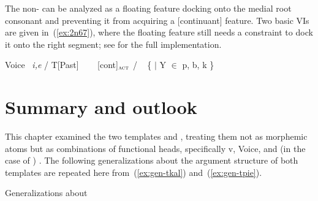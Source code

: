 \begin{exe}
\begin{xlist}
\begin{exe}
\begin{xlist}
\begin{exe}
\begin{xlist}
\begin{exe}
\begin{exe}
\begin{xlist}
\begin{exe}
\begin{xlist}
\begin{exe}
\begin{xlist}
\begin{exe}
\begin{xlist}
\begin{exe}
\begin{xlist}
\begin{exe}
\begin{xlist}
\begin{exe}
\begin{xlist}
\begin{exe}
\begin{xlist}
\begin{exe}
\begin{xlist}
\begin{exe}
\begin{xlist}
\begin{exe}
\begin{xlist}
\begin{exe}
\begin{xlist}
\begin{exe}
\begin{xlist}
\begin{exe}
\begin{exe}
\begin{xlist}
\begin{exe}
\begin{xlist}
\begin{exe}
\begin{xlist}
\begin{exe}
\begin{xlist}
{\begin{exe}
\begin{xlist}
\begin{exe}
\begin{xlist}
\begin{exe}
\begin{xlist}
\begin{exe}
\begin{xlist}
\begin{xlist}
\begin{xlist}
\begin{exe}
\begin{xlist}
\begin{xlist}
\begin{xlist}
\begin{exe}
\begin{exe}
\begin{xlist}
\begin{exe}
\begin{xlist}
\begin{exe}
\begin{xlist}
\begin{exe}
\begin{xlist}
\begin{exe}
\begin{xlist}
\begin{exe}
\begin{xlist}
\begin{exe}
\begin{xlist}
\begin{exe}
\begin{exe}
\begin{xlist}
\begin{xlist}
\begin{exe}
\begin{xlist}
\begin{exe}
\begin{xlist}
\begin{exe}
\begin{xlist}
\begin{exe}
\begin{xlist}
\begin{exe}
\begin{xlist}
\begin{exe}
\begin{xlist}
\begin{exe}
\begin{exe}
\begin{xlist}
\begin{exe}
\begin{xlist}
\begin{exe}
\begin{xlist}
\begin{exe}
\begin{xlist}
\begin{exe}
\begin{xlist}
\begin{exe}
\begin{xlist}
\begin{exe}
\begin{xlist}
\begin{exe}
\begin{xlist}
 \z
\z 

The non- can be analyzed as a floating feature docking onto the medial root consonant and preventing it from acquiring a [continuant] feature. Two basic VIs are given in~(\ref{ex:2n67}), where the floating feature still needs a constraint to dock it onto the right segment; see \cite{kastner18nllt} for the full implementation.
 \begin{exe}
 \ex  \label{ex:2n67}
 \begin{xlist} 
 	\ex  \label{vi:voice2}	Voice \lra~\emph{i,e} / T[Past] \trace~\va 
	\ex  \label{vi:va}\va~\lra~[\textminus{}cont]$_{\gsc{ACT}}$ / \trace~ \{  $|$ Y $\in$ p, b, k \} 
			
 \z
\z 

\section{Summary and outlook} \label{voice:conc}
This chapter examined the two templates {\tkal} and {\tpie}, treating them not as morphemic atoms but as combinations of functional heads, specifically v, Voice, and (in the case of {\tpie}) {\va}. The following generalizations about the argument structure of both templates are repeated here from~(\ref{ex:gen-tkal}) and~(\ref{ex:gen-tpie}).

 \begin{exe}
 \ex  \label{ex:gen-tkal2}Generalizations about {\tkal}
 \begin{xlist} 
 	\ex 
\end{xlist}
\end{exe}
\end{xlist}
\end{exe}
\end{xlist}
\end{exe}
\end{xlist}
\end{exe}
\end{xlist}
\end{exe}
\end{xlist}
\end{exe}
\end{xlist}
\end{exe}
\end{xlist}
\end{exe}
\end{xlist}
\end{exe}
\end{xlist}
\end{exe}
\end{exe}
\end{xlist}
\end{exe}
\end{xlist}
\end{exe}
\end{xlist}
\end{exe}
\end{xlist}
\end{exe}
\end{xlist}
\end{exe}
\end{xlist}
\end{exe}
\end{xlist}
\end{xlist}
\end{exe}
\end{exe}
\end{xlist}
\end{exe}
\end{xlist}
\end{exe}
\end{xlist}
\end{exe}
\end{xlist}
\end{exe}
\end{xlist}
\end{exe}
\end{xlist}
\end{exe}
\end{xlist}
\end{exe}
\end{exe}
\end{xlist}
\end{xlist}
\end{xlist}
\end{exe}
\end{xlist}
\end{xlist}
\end{xlist}
\end{exe}
\end{xlist}
\end{exe}
\end{xlist}
\end{exe}
\end{xlist}
\end{exe}}
\end{xlist}
\end{exe}
\end{xlist}
\end{exe}
\end{xlist}
\end{exe}
\end{xlist}
\end{exe}
\end{exe}
\end{xlist}
\end{exe}
\end{xlist}
\end{exe}
\end{xlist}
\end{exe}
\end{xlist}
\end{exe}
\end{xlist}
\end{exe}
\end{xlist}
\end{exe}
\end{xlist}
\end{exe}
\end{xlist}
\end{exe}
\end{xlist}
\end{exe}
\end{xlist}
\end{exe}
\end{xlist}
\end{exe}
\end{xlist}
\end{exe}
\end{xlist}
\end{exe}
\end{exe}
\end{xlist}
\end{exe}
\end{xlist}
\end{exe}
\end{xlist}
\end{exe}
